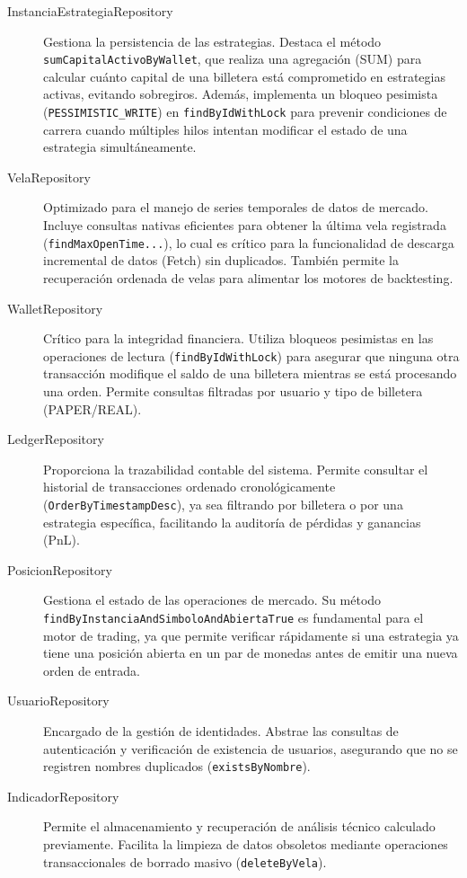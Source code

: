 \documentclass[12pt, letterpaper]{article}
\begin{document}
\begin{description}
    \item[InstanciaEstrategiaRepository] Gestiona la persistencia de las estrategias. Destaca el método \texttt{sumCapitalActivoByWallet}, que realiza una agregación (SUM) para calcular cuánto capital de una billetera está comprometido en estrategias activas, evitando sobregiros. Además, implementa un bloqueo pesimista (\texttt{PESSIMISTIC\_WRITE}) en \texttt{findByIdWithLock} para prevenir condiciones de carrera cuando múltiples hilos intentan modificar el estado de una estrategia simultáneamente.

    \item[VelaRepository] Optimizado para el manejo de series temporales de datos de mercado. Incluye consultas nativas eficientes para obtener la última vela registrada (\texttt{findMaxOpenTime...}), lo cual es crítico para la funcionalidad de descarga incremental de datos (Fetch) sin duplicados. También permite la recuperación ordenada de velas para alimentar los motores de backtesting.

    \item[WalletRepository] Crítico para la integridad financiera. Utiliza bloqueos pesimistas en las operaciones de lectura (\texttt{findByIdWithLock}) para asegurar que ninguna otra transacción modifique el saldo de una billetera mientras se está procesando una orden. Permite consultas filtradas por usuario y tipo de billetera (PAPER/REAL).

    \item[LedgerRepository] Proporciona la trazabilidad contable del sistema. Permite consultar el historial de transacciones ordenado cronológicamente (\texttt{OrderByTimestampDesc}), ya sea filtrando por billetera o por una estrategia específica, facilitando la auditoría de pérdidas y ganancias (PnL).

    \item[PosicionRepository] Gestiona el estado de las operaciones de mercado. Su método \texttt{findByInstanciaAndSimboloAndAbiertaTrue} es fundamental para el motor de trading, ya que permite verificar rápidamente si una estrategia ya tiene una posición abierta en un par de monedas antes de emitir una nueva orden de entrada.

    \item[UsuarioRepository] Encargado de la gestión de identidades. Abstrae las consultas de autenticación y verificación de existencia de usuarios, asegurando que no se registren nombres duplicados (\texttt{existsByNombre}).

    \item[IndicadorRepository] Permite el almacenamiento y recuperación de análisis técnico calculado previamente. Facilita la limpieza de datos obsoletos mediante operaciones transaccionales de borrado masivo (\texttt{deleteByVela}).
\end{description}
\end{document}
